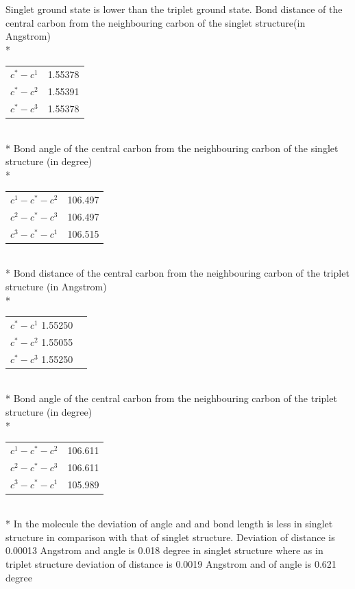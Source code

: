 \documentclass{article}
\begin{document}
Singlet ground state is lower than the triplet ground state.
Bond distance of the central carbon from the neighbouring carbon of the singlet structure(in Angstrom)\\*
\begin{tabular}{c c}
\(c^{*}-c^{1}\) & 1.55378 \\
\(c^{*}-c^{2}\) & 1.55391 \\
\(c^{*}-c^{3}\) & 1.55378\\
\end{tabular}\\*
Bond angle of the central carbon from the neighbouring carbon of the singlet structure (in degree)\\*
\begin{tabular}{c c}
\(c^{1}-c^{*}-c^{2}\) & 106.497\\
\(c^{2}-c^{*}-c^{3}\) & 106.497\\
\(c^{3}-c^{*}-c^{1}\) & 106.515\\
\end{tabular}\\*
Bond distance of the central carbon from the neighbouring carbon of the triplet structure (in Angstrom)\\*
\begin{tabular}{c c}
\(c^{*}-c^{1}\) 1.55250 \\
\(c^{*}-c^{2}\) 1.55055 \\
\(c^{*}-c^{3}\) 1.55250 \\
\end{tabular}\\*
Bond angle of the central carbon from the neighbouring carbon of the triplet structure (in degree)\\*
\begin{tabular}{c c}
\(c^{1}-c^{*}-c^{2}\) & 106.611 \\
\(c^{2}-c^{*}-c^{3}\) & 106.611 \\
\(c^{3}-c^{*}-c^{1}\) & 105.989\\
\end{tabular}\\*
In the molecule the deviation of angle and and bond length is less in singlet structure in comparison with that of singlet structure. 
Deviation of distance is 0.00013 Angstrom and angle is 0.018 degree in singlet structure where as in triplet structure deviation of distance is 0.0019 Angstrom and of angle is 0.621 degree

\pagebreak
\end{document}
